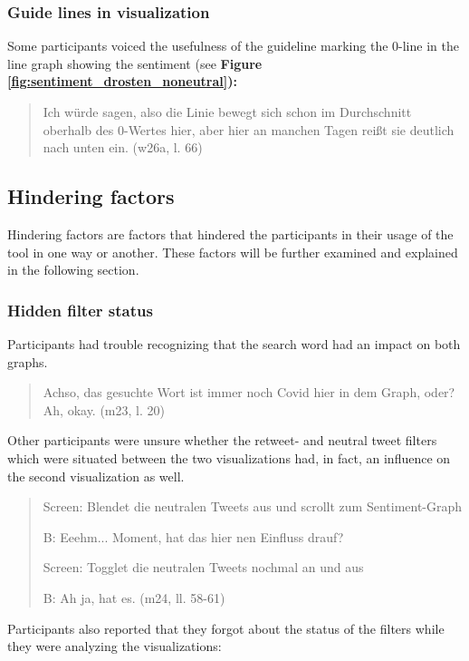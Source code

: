 \subsubsection*{Guide lines in visualization}
Some participants voiced the usefulness of the guideline marking the 0-line in the line graph showing the sentiment (see \textbf{Figure \ref{fig:sentiment_drosten_noneutral}):}

\begin{quote}
    Ich würde sagen, also die Linie bewegt sich schon im Durchschnitt oberhalb des 0-Wertes hier, aber hier an manchen Tagen reißt sie deutlich nach unten ein. (w26a, l. 66)
\end{quote}

\clearpage
\subsection{Hindering factors}
Hindering factors are factors that hindered the participants in their usage of the tool in one way or another. These factors will be further examined and explained in the following section.

\subsubsection*{Hidden filter status}
Participants had trouble recognizing that the search word had an impact on both graphs.

\begin{quote}
    Achso, das gesuchte Wort ist immer noch Covid hier in dem Graph, oder? Ah, okay. (m23, l. 20)
\end{quote}

Other participants were unsure whether the retweet- and neutral tweet filters which were situated between the two visualizations had, in fact, an influence on the second visualization as well.

\begin{quote}
    Screen: Blendet die neutralen Tweets aus und scrollt zum Sentiment-Graph

    B: Eeehm... Moment, hat das hier nen Einfluss drauf?

    Screen: Togglet die neutralen Tweets nochmal an und aus

    B: Ah ja, hat es. (m24, ll. 58-61)
\end{quote}

Participants also reported that they forgot about the status of the filters while they were analyzing the visualizations:


